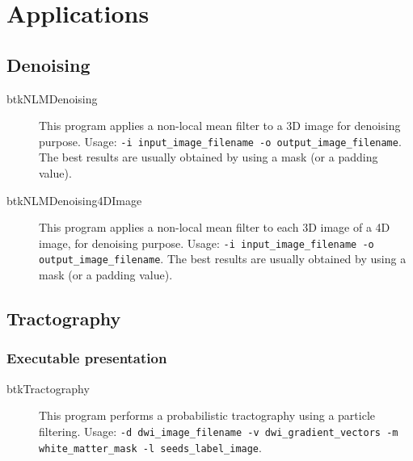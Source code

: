\section{Applications}

\subsection{Denoising}

\begin{description}
 \item[btkNLMDenoising] This program applies a non-local mean filter to a 3D image for denoising purpose. Usage: \texttt{-i input\_image\_filename -o output\_image\_filename}. The best results are usually obtained by using a mask (or a padding value).
\end{description}

\begin{description}
 \item[btkNLMDenoising4DImage] This program applies a non-local mean filter to each 3D image of a 4D image, for denoising purpose. Usage: \texttt{-i input\_image\_filename -o output\_image\_filename}. The best results are usually obtained by using a mask (or a padding value).
\end{description}


\subsection{Tractography}

    \subsubsection*{Executable presentation}
        \begin{description}
        \item[btkTractography] This program performs a probabilistic tractography using a particle filtering. Usage: \texttt{-d dwi\_image\_filename -v dwi\_gradient\_vectors -m white\_matter\_mask -l seeds\_la\-bel\_image}.
        \end{description}

